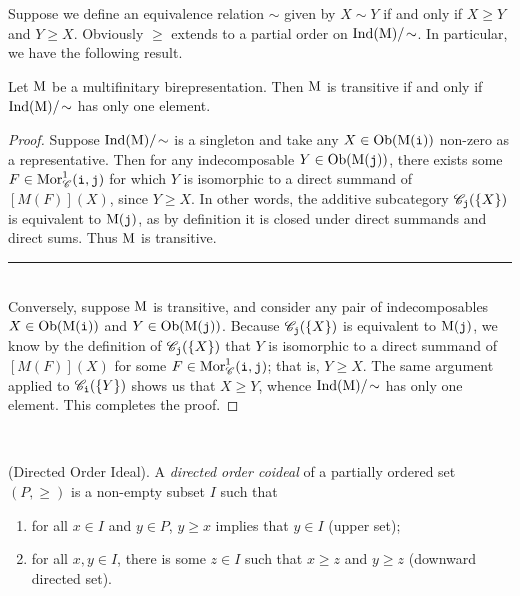 \noindent Suppose we define an equivalence relation $\sim$ given by $X \sim Y$ if and only if $X \geq Y$ and $Y \geq X$. Obviously $\geq$ extends to a partial order on $\textup{Ind}(\textup{M})/\!\sim$. In particular, we have the following result.\newpage

\noindent\begin{proposition}\label{Transitive2} Let $\textup{M}$ be a multifinitary birepresentation. Then $\textup{M}$ is transitive if and only if\linebreak $\textup{Ind}(\textup{M})/\!\sim$ has only one element.\\
\end{proposition}

\noindent\begin{proof} Suppose $\textup{Ind}(\textup{M})/\!\sim$ is a singleton and take any $X \in \textnormal{Ob}(\textup{M}(\textnormal{\texttt{i}}))$ non-zero as a representative. Then for any indecomposable $Y \in \textnormal{Ob}(\textup{M}(\textnormal{\texttt{j}}))$, there exists some $F \in \textnormal{Mor}_\mathscr{C}^1(\textnormal{\texttt{i}}, \textnormal{\texttt{j}})$ for which $Y$ is isomorphic to a direct summand of $[M(F)](X)$, since $Y \geq X$. In other words, the additive subcategory $\mathscr{C}_{\textnormal{\texttt{j}}}(\{X\})$ is equivalent to $\textup{M}(\textnormal{\texttt{j}})$, as by definition it is closed under direct summands and direct sums. Thus $\textup{M}$ is transitive.\\[-1.5\baselineskip]
\begin{center}
\rule{0.5\linewidth}{1pt}
\end{center}
\noindent\\[-\baselineskip]
\noindent Conversely, suppose $\textup{M}$ is transitive, and consider any pair of indecomposables $X \in \textnormal{Ob}(\textup{M}(\textnormal{\texttt{i}}))$ and $Y \in \textnormal{Ob}(\textup{M}(\textnormal{\texttt{j}}))$. Because $\mathscr{C}_{\textnormal{\texttt{j}}}(\{X\})$ is equivalent to $\textup{M}(\textnormal{\texttt{j}})$, we know by the definition of $\mathscr{C}_{\textnormal{\texttt{j}}}(\{X\})$ that $Y$ is isomorphic to a direct summand of $[M(F)](X)$ for some $F \in \textnormal{Mor}_\mathscr{C}^1(\textnormal{\texttt{i}}, \textnormal{\texttt{j}})$; that is, $Y \geq X$. The same argument applied to $\mathscr{C}_{\textnormal{\texttt{i}}}(\{Y\})$ shows us that $X \geq Y$, whence $\textup{Ind}(\textup{M})/\!\sim$ has only one element. This completes the proof.
\end{proof}\\

\noindent\begin{definition}\textup{(Directed Order Ideal).} A {\em directed order coideal} of a partially ordered set $(P, \geq)$ is a non-empty subset $I$ such that
\begin{enumerate}[label=$\bullet$, leftmargin=4\parindent]
\item for all $x \in I$ and $y \in P$, $y \geq x$ implies that $y \in I$ (upper set);
\item for all $x, y \in I$, there is some $z \in I$ such that $x \geq z$ and $y \geq z$ (downward directed set).\\
\end{enumerate}
\end{definition}

